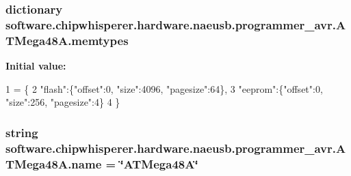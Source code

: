 \subsubsection[{memtypes}]{\setlength{\rightskip}{0pt plus 5cm}dictionary software.\+chipwhisperer.\+hardware.\+naeusb.\+programmer\+\_\+avr.\+A\+T\+Mega48\+A.\+memtypes\hspace{0.3cm}{\ttfamily [static]}}\label{classsoftware_1_1chipwhisperer_1_1hardware_1_1naeusb_1_1programmer__avr_1_1ATMega48A_adf66119411968536a27291e2a671b7d0}
{\bfseries Initial value\+:}
\begin{DoxyCode}
1 = \{
2        \textcolor{stringliteral}{"flash"}:\{\textcolor{stringliteral}{"offset"}:0, \textcolor{stringliteral}{"size"}:4096, \textcolor{stringliteral}{"pagesize"}:64\},
3        \textcolor{stringliteral}{"eeprom"}:\{\textcolor{stringliteral}{"offset"}:0, \textcolor{stringliteral}{"size"}:256, \textcolor{stringliteral}{"pagesize"}:4\}
4      \}
\end{DoxyCode}
\hypertarget{classsoftware_1_1chipwhisperer_1_1hardware_1_1naeusb_1_1programmer__avr_1_1ATMega48A_a16da8f2833e6e1d9ebad428fce62f25f}{}
\subsubsection[{name}]{\setlength{\rightskip}{0pt plus 5cm}string software.\+chipwhisperer.\+hardware.\+naeusb.\+programmer\+\_\+avr.\+A\+T\+Mega48\+A.\+name = \char`\"{}A\+T\+Mega48\+A\char`\"{}\hspace{0.3cm}{\ttfamily [static]}}\label{classsoftware_1_1chipwhisperer_1_1hardware_1_1naeusb_1_1programmer__avr_1_1ATMega48A_a16da8f2833e6e1d9ebad428fce62f25f}
\hypertarget{classsoftware_1_1chipwhisperer_1_1hardware_1_1naeusb_1_1programmer__avr_1_1ATMega48A_a73f9271d45e7959dc26f0099f160b0d3}{}
